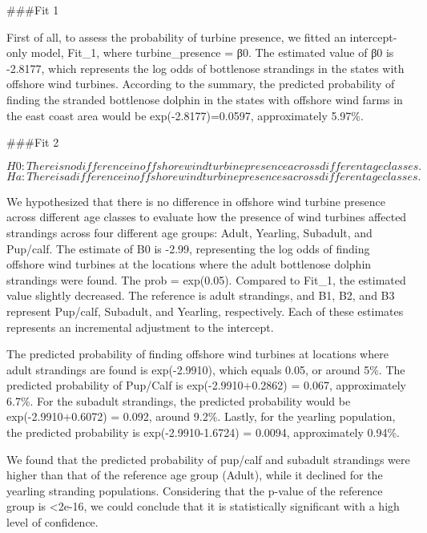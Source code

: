 \documentclass[
]{article}
\begin{document}
\#\#\#Fit 1

First of all, to assess the probability of turbine presence, we fitted
an intercept-only model, Fit\_1, where turbine\_presence = β0. The
estimated value of β0 is -2.8177, which represents the log odds of
bottlenose strandings in the states with offshore wind turbines.
According to the summary, the predicted probability of finding the
stranded bottlenose dolphin in the states with offshore wind farms in
the east coast area would be exp(-2.8177)=0.0597, approximately 5.97\%.

\#\#\#Fit 2

\[H0: There is no difference in offshore wind turbine presence across different age classes. \]
\[Ha: There is a difference in offshore wind turbine presences across different age classes. \]

We hypothesized that there is no difference in offshore wind turbine
presence across different age classes to evaluate how the presence of
wind turbines affected strandings across four different age groups:
Adult, Yearling, Subadult, and Pup/calf. The estimate of B0 is -2.99,
representing the log odds of finding offshore wind turbines at the
locations where the adult bottlenose dolphin strandings were found. The
prob = exp(0.05). Compared to Fit\_1, the estimated value slightly
decreased. The reference is adult strandings, and B1, B2, and B3
represent Pup/calf, Subadult, and Yearling, respectively. Each of these
estimates represents an incremental adjustment to the intercept.

The predicted probability of finding offshore wind turbines at locations
where adult strandings are found is exp(-2.9910), which equals 0.05, or
around 5\%. The predicted probability of Pup/Calf is exp(-2.9910+0.2862)
= 0.067, approximately 6.7\%. For the subadult strandings, the predicted
probability would be exp(-2.9910+0.6072) = 0.092, around 9.2\%. Lastly,
for the yearling population, the predicted probability is
exp(-2.9910-1.6724) = 0.0094, approximately 0.94\%.

We found that the predicted probability of pup/calf and subadult
strandings were higher than that of the reference age group (Adult),
while it declined for the yearling stranding populations. Considering
that the p-value of the reference group is \textless2e-16, we could
conclude that it is statistically significant with a high level of
confidence.
\end{document}
